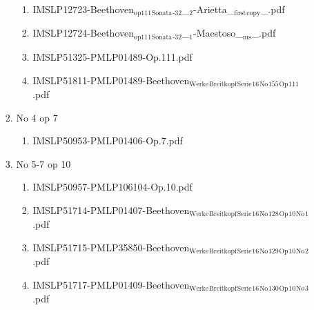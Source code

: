 \documentclass[11pt]{article}
\begin{document}
\begin{enumerate}
\begin{enumerate}
\begin{enumerate}
\begin{enumerate}
\item IMSLP12723-Beethoven$_{\text{op111}}$$_{\text{Sonata}}$$_{\text{-32}}$\_$_{\text{2}}$-Arietta\_$_{\text{first}}$$_{\text{copy}}$\_.pdf
\label{sec-1-1-1-1-44-9-6-8-69-2}

\item IMSLP12724-Beethoven$_{\text{op111}}$$_{\text{Sonata}}$$_{\text{-32}}$\_$_{\text{1}}$-Maestoso\_$_{\text{ms}}$\_.pdf
\label{sec-1-1-1-1-44-9-6-8-69-3}

\item IMSLP51325-PMLP01489-Op.111.pdf
\label{sec-1-1-1-1-44-9-6-8-69-4}

\item IMSLP51811-PMLP01489-Beethoven$_{\text{Werke}}$$_{\text{Breitkopf}}$$_{\text{Serie}}$$_{\text{16}}$$_{\text{No}}$$_{\text{155}}$$_{\text{Op}}$$_{\text{111}}$.pdf
\label{sec-1-1-1-1-44-9-6-8-69-5}
\end{enumerate}

\item No 4 op 7
\label{sec-1-1-1-1-44-9-6-8-70}
\begin{enumerate}
\item IMSLP50953-PMLP01406-Op.7.pdf
\label{sec-1-1-1-1-44-9-6-8-70-1}
\end{enumerate}

\item No 5-7 op 10
\label{sec-1-1-1-1-44-9-6-8-71}
\begin{enumerate}
\item IMSLP50957-PMLP106104-Op.10.pdf
\label{sec-1-1-1-1-44-9-6-8-71-1}

\item IMSLP51714-PMLP01407-Beethoven$_{\text{Werke}}$$_{\text{Breitkopf}}$$_{\text{Serie}}$$_{\text{16}}$$_{\text{No}}$$_{\text{128}}$$_{\text{Op}}$$_{\text{10}}$$_{\text{No}}$$_{\text{1}}$.pdf
\label{sec-1-1-1-1-44-9-6-8-71-2}

\item IMSLP51715-PMLP35850-Beethoven$_{\text{Werke}}$$_{\text{Breitkopf}}$$_{\text{Serie}}$$_{\text{16}}$$_{\text{No}}$$_{\text{129}}$$_{\text{Op}}$$_{\text{10}}$$_{\text{No}}$$_{\text{2}}$.pdf
\label{sec-1-1-1-1-44-9-6-8-71-3}

\item IMSLP51717-PMLP01409-Beethoven$_{\text{Werke}}$$_{\text{Breitkopf}}$$_{\text{Serie}}$$_{\text{16}}$$_{\text{No}}$$_{\text{130}}$$_{\text{Op}}$$_{\text{10}}$$_{\text{No}}$$_{\text{3}}$.pdf
\label{sec-1-1-1-1-44-9-6-8-71-4}
\end{enumerate}


\end{enumerate}
\end{enumerate}
\end{enumerate}
\end{document}
